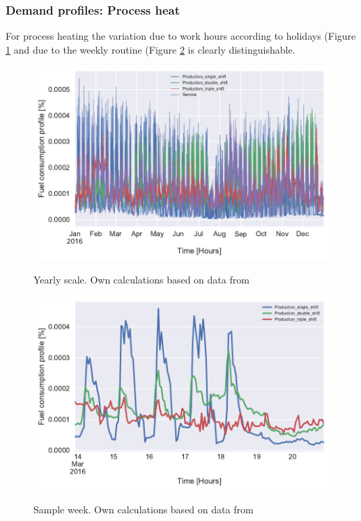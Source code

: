 \documentclass[review]{elsarticle}
\begin{document}
\subsubsection{Demand profiles: Process heat}
For process heating the variation due to work hours according to holidays (Figure \ref{fig:heat_process_year} and due to the weekly routine (Figure \ref{fig:heat_process_week} is clearly distinguishable.

\begin{figure}[H]
\centering
\includegraphics[width=\linewidth]{Img/profiles/heatprofile_process_year_perc.pdf}\\
\caption{Yearly scale. Own calculations based on data from \cite{DanskGasDistribution2016,VM2015}}
\label{fig:heat_process_year}
\end{figure}
	
\begin{figure}[H]
\centering
\includegraphics[width=\linewidth]{Img/profiles/heatprofile_process_week_perc_noserv.pdf}\\
\caption{Sample week. Own calculations based on data from \cite{DanskGasDistribution2016,VM2015}}
\label{fig:heat_process_week}
\end{figure}
\end{document}

